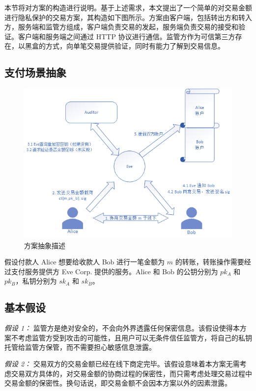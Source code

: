 本节将对方案的构造进行说明。基于上述需求，本文提出了一个简单的对交易金额进行隐私保护的交易方案，其构造如下图所示。方案由客户端，包括转出方和转入方，服务端和监管方组成，客户端负责交易的发起，服务端负责交易的接受和验证。客户端和服务端之间通过 HTTP 协议进行通信。监管方作为可信第三方存在，以黑盒的方式，向单笔交易提供验证，同时有能力了解到交易信息。

\subsection{支付场景抽象}

\begin{figure}
    \centering
    \includegraphics[width=0.8\linewidth]{Figures/chimata-transaction-abstract.png}
    \caption{方案抽象描述}\label{Fig:chimata_abstract_transaction}
\end{figure}

假设付款人 Alice 想要给收款人 Bob 进行一笔金额为 $m$ 的转账，转账操作需要经过支付服务提供方 Eve Corp. 提供的服务。Alice 和 Bob 的公钥分别为 $pk_A$ 和 $pk_B$，私钥分别为 $sk_A$ 和 $sk_B$。

\subsection{基本假设}

\textit{假设 1：} 监管方是绝对安全的，不会向外界透露任何保密信息。该假设使得本方案不考虑监管方受到攻击的可能性，且用户可以无条件信任监管方，将自己的私钥托管给监管方保管，而不需要担心敏感信息泄露。

\textit{假设 2：} 交易双方的交易金额已经在线下商定完毕。该假设意味着本方案无需考虑交易双方具体的，对交易金额的协商过程的保密性，而只需考虑处理交易过程中交易金额的保密性。换句话说，即交易金额不会因本方案以外的因素泄露。

